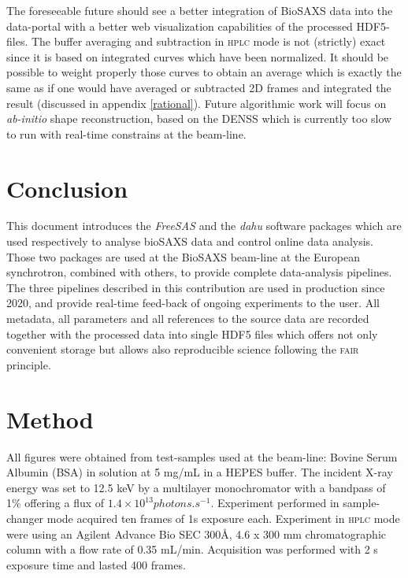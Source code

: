\documentclass[preprint]{iucr}              %
\begin{document}
The foreseeable future should see a better integration of BioSAXS data into the data-portal with a better web visualization capabilities of the processed HDF5-files. 
The buffer averaging and subtraction in \textsc{hplc} mode is not (strictly) exact since it is based on integrated curves which have been normalized.
It should be possible to weight properly those curves to obtain an average which is exactly the same as if one would have averaged or subtracted 2D frames and integrated the result (discussed in appendix \ref{rational}).
Future algorithmic work will focus on \textit{ab-initio} shape reconstruction, based on the DENSS \cite{denss} which is currently too slow to run with real-time constrains at the beam-line.

\section{Conclusion}

This document introduces the \textit{FreeSAS} and the \textit{dahu} software packages which are used respectively to analyse bioSAXS data and control online data analysis.
Those two packages are used at the BioSAXS beam-line at the European synchrotron, combined with others, to provide complete data-analysis pipelines.
The three pipelines described in this contribution are used in production since 2020, and provide real-time feed-back of ongoing experiments to the user.
All metadata, all parameters and all references to the source data are recorded together with the processed data into single HDF5 files which offers 
not only convenient storage but allows also reproducible science following the \textsc{fair} principle. 

\appendix
\section{Method}

All figures were obtained from test-samples used at the beam-line: Bovine Serum Albumin (BSA) in solution at 5 mg/mL in a HEPES buffer.
The incident X-ray energy was set to 12.5 keV by a multilayer monochromator with a bandpass of 1\% offering a flux of $1.4\times 10^{13} photons.s^{-1}$.
Experiment performed in sample-changer mode acquired ten frames of 1s exposure each.
Experiment in \textsc{hplc} mode were using an Agilent Advance Bio SEC 300Å, 4.6 x 300 mm chromatographic column with a flow rate of 0.35 mL/min.
Acquisition was performed with 2 s exposure time and lasted 400 frames. 
\end{document}
